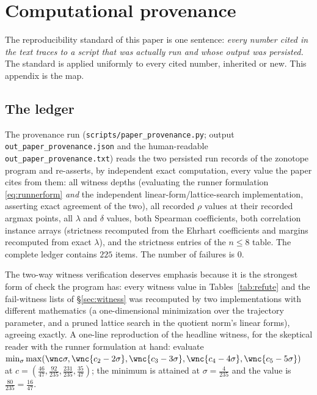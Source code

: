 
\section{Computational provenance}\label{sec:prov}

The reproducibility standard of this paper is one sentence:
\emph{every number cited in the text traces to a script that was
actually run and whose output was persisted.} The standard is applied
uniformly to every cited number, inherited or new. This appendix is
the map.

\subsection{The ledger}

The provenance run (\texttt{scripts/paper\_provenance.py}; output
\texttt{out\_paper\_provenance.json} and the human-readable
\texttt{out\_paper\_provenance.txt}) reads the two persisted run records
of the zonotope program and re-asserts, by independent exact
computation, every value the paper cites from them: all witness depths
(evaluating the runner formulation \eqref{eq:runnerform} \emph{and} the
independent linear-form/lattice-search implementation, asserting exact
agreement of the two), all recorded $\rho$ values at their recorded
argmax points, all $\lambda$ and $\delta$ values, both Spearman
coefficients, both correlation instance arrays (strictness recomputed
from the Ehrhart coefficients and margins recomputed from exact
$\lambda$), and the strictness entries of the $n\le8$ table. The
complete ledger contains $225$ items. The number of failures is $0$.

The two-way witness verification deserves emphasis because it is the
strongest form of check the program has: every witness value in
Tables~\ref{tab:refute} and the fail-witness lists of
\S\ref{sec:witness} was recomputed by two implementations with different
mathematics (a one-dimensional minimization over the trajectory
parameter, and a pruned lattice search in the quotient norm's linear
forms), agreeing exactly. A one-line reproduction of the headline
witness, for the skeptical reader with the runner formulation at
hand: evaluate
$\min_\sigma\max(\wnc\sigma,\wnc{c_2-2\sigma},\wnc{c_3-3\sigma},
\wnc{c_4-4\sigma},\wnc{c_5-5\sigma})$ at
$c=(\tfrac{46}{47},\tfrac{92}{235},\tfrac{231}{235},\tfrac{35}{47})$;
the minimum is attained at $\sigma=\tfrac{4}{235}$ and the value is
$\tfrac{80}{235}=\tfrac{16}{47}$.


